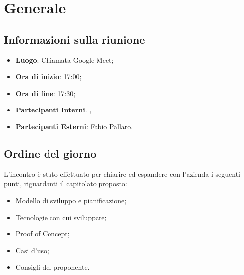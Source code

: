 \section{Generale}

\vspace{10pt}


\subsection{Informazioni sulla riunione}
\begin{itemize}
	\item \textbf{Luogo}: Chiamata Google Meet\glo{};
	\item \textbf{Ora di inizio}: 17:00;
	\item \textbf{Ora di fine}: 17:30;
	\item \textbf{Partecipanti Interni}: \team;
	\item \textbf{Partecipanti Esterni}: Fabio Pallaro.
	
\end{itemize}

\vspace{5pt}

\subsection{Ordine del giorno}
L'incontro è stato effettuato per chiarire ed espandere con l'azienda i seguenti punti, riguardanti il capitolato proposto:
\begin{itemize}
	\item Modello di sviluppo e pianificazione;
	\item Tecnologie con cui sviluppare;
	\item Proof of Concept;
	\item Casi d'uso;
	\item Consigli del proponente.
\end{itemize}